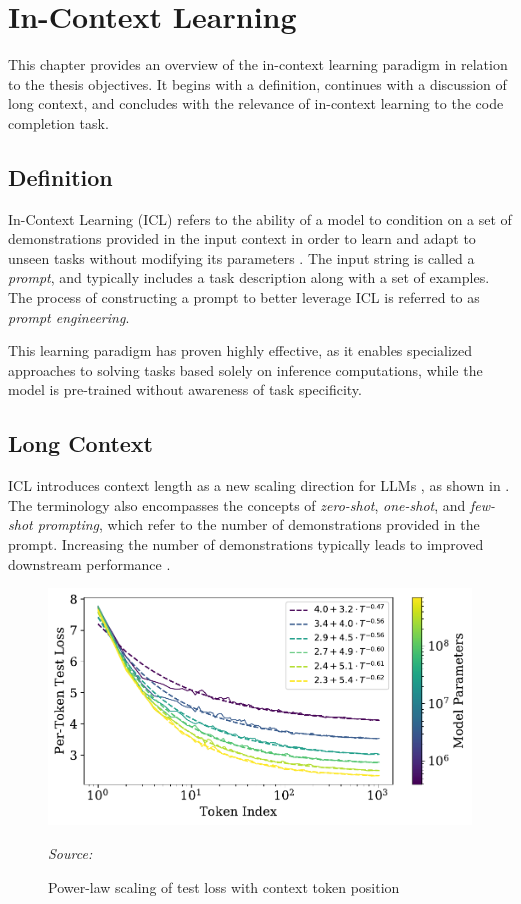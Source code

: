 \chapter{In-Context Learning}\label{chap:in-context-learning}

This chapter provides an overview of the in-context learning paradigm in relation to the thesis objectives. It begins with a definition, continues with a discussion of long context, and concludes with the relevance of in-context learning to the code completion task.

\section{Definition}

In-Context Learning (ICL) refers to the ability of a model to condition on a set of demonstrations provided in the input context in order to learn and adapt to unseen tasks without modifying its parameters \parencite{brown2020}. The input string is called a \textit{prompt}, and typically includes a task description along with a set of examples. The process of constructing a prompt to better leverage ICL is referred to as \textit{prompt engineering}.

This learning paradigm has proven highly effective, as it enables specialized approaches to solving tasks based solely on inference computations, while the model is pre-trained without awareness of task specificity.

\section{Long Context}

ICL introduces context length as a new scaling direction for LLMs \parencite{kaplan2020}, as shown in . The terminology also encompasses the concepts of \textit{zero-shot}, \textit{one-shot}, and \textit{few-shot prompting}, which refer to the number of demonstrations provided in the prompt. Increasing the number of demonstrations typically leads to improved downstream performance \parencite{brown2020}.

\begin{figure}[ht]
    \centering
    \includegraphics[width=\textwidth]{figures/context-power-law.pdf}
    \caption{Power-law scaling of test loss with context token position}\label{fig:context-power-law}
    \hfill\textit{Source: \citet{kaplan2020}}
\end{figure}

